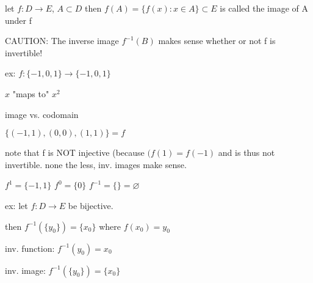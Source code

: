 \documentclass[class=scrartcl, crop=false]{standalone}
\begin{document}


let $f: D \to E$, $A \subset D$
then $f(A) = \{f(x): x \in A\} \subset E$ is called the image of A under f


CAUTION: The inverse image $f^{-1}(B)$ makes sense whether or not f is invertible!

ex: $f: \{-1, 0, 1\} \to \{-1, 0, 1\}$ 

$x$ "maps to" $x^2$ 

image vs. codomain

$\{(-1, 1), (0, 0), (1, 1) \} = f$

note that f is NOT injective (because $(f(1) = f(-1)$ and is thus not invertible. none the less, inv. images make sense.

$f^{1} = \{-1, 1\}$
$f^{0} = \{0\}$
$f^{-1} = \{\} = \varnothing$

ex: let $f: D \to E$ be bijective. 

then $f^{-1}(\{y_0\}) = \{x_0\}$ where $f(x_0) = y_0$

inv. function: $f^{-1}(y_0) = x_0$

inv. image:  $f^{-1}(\{y_0\}) = \{x_0\}$ 

\end{document}
